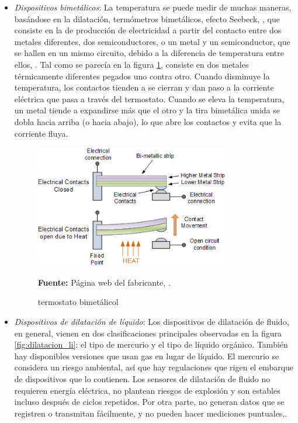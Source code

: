 \begin{itemize}
    \item \textit{Dispositivos bimet\'alicos}:  La temperatura se puede medir de muchas maneras, basándose en la dilatación, termómetros bimetálicos, efecto Seebeck, \cite{martinez_soriano_evaluacion_2020}, que consiste en la de producción de electricidad a partir del contacto entre dos metales diferentes, dos semiconductores, o un metal y un semiconductor, que se hallen en un mismo circuito, debido a la diferencia de temperatura entre ellos, \cite{universidad_publica_de_navarra_introduccion_nodate}. 
    Tal como se parec\'ia en la figura \ref{fig:biMetal}, consiste en dos metales t\'ermicamente diferentes pegados uno contra otro. Cuando disminuye la temperatura, los contactos tienden a se cierran y dan paso a la corriente el\'ectrica que pasa a trav\'es del termostato. Cuando se eleva la temperatura, un metal tiende a expandirse  m\'as que el otro y la tira bimet\'alica unida se dobla hacia arriba (o hacia abajo), lo que abre los contactos y evita que la corriente fluya.
    
    \begin{figure}[ht]
        \centering
        \includegraphics[width=0.8\textwidth]{Imagenes/cap2/biMetal.jpg}\\
        \bigskip
        \caption { termostato bimet\'alicol } 
        \textbf{Fuente:} P\'agina web del fabricante, \cite{huseyn_a_sensores_2020}.
        \label{fig:biMetal}
    \end{figure}
    
    \item \textit{Dispositivos de dilatación de l\'iquido}: Los dispositivos de dilatación de fluido, en general, vienen en dos clasificaciones principales observadas en la figura \ref{fig:dilatacion_li}: el tipo de mercurio y el tipo de líquido orgánico. También hay disponibles versiones que usan gas en lugar de líquido. El mercurio se considera un riesgo ambiental, así que hay regulaciones que rigen el embarque de dispositivos que lo contienen. Los sensores de dilatación de fluido no requieren energía eléctrica, no plantean riesgos de explosión y son estables incluso después de ciclos repetidos. Por otra parte, no generan datos que se registren o transmitan fácilmente, y no pueden hacer mediciones puntuales,\cite{omega_engineering_inc_medicion_nodate}.
    

\end{itemize}
